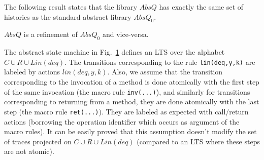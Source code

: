 \begin{figure}[t]
{%
  }
  \label{fig:transitions:AbsQ}
\vspace{-6mm}
\end{figure}

The following result states that the library $AbsQ$ has exactly the same set of histories as the standard abstract library $AbsQ_0$. %

\vspace{-1.5mm}
\begin{theorem}\label{th:absImplQueue}
$AbsQ$ is a refinement of $AbsQ_0$ and vice-versa.
\vspace{-2mm}
\end{theorem}

The abstract state machine in Fig.~\ref{fig:transitions:AbsQ} defines an LTS over the alphabet $C\cup R\cup Lin(deq)$. The transitions corresponding to the rule {\tt lin(deq,y,k)} are labeled by  actions $lin(deq,y,k)$. Also, we assume that the transition corresponding to the invocation of a method is done atomically with the first step of the same invocation (the macro rule {\tt inv(...)}), and similarly for transitions corresponding to returning from a method, they are done atomically with the last step (the macro rule {\tt ret(...)}). They are labeled as expected with call/return actions (borrowing the operation identifier which occurs as argument of the macro rules). It can be easily proved that this assumption doesn't modify the set of traces projected on $C\cup R\cup Lin(deq)$ (compared to an LTS where these steps are not atomic).



